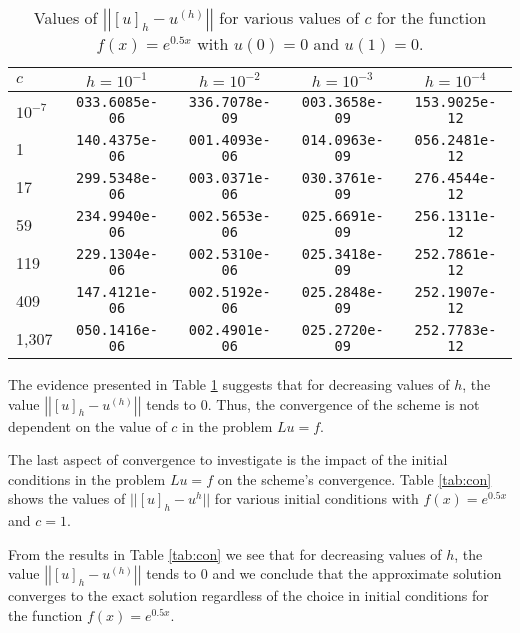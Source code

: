 \begin{table}[h!]
  \centering
  \bgroup
  \def\arraystretch{1.5}
  \begin{tabular}{| l | c | c | c | c |}
    \hline
    $c$ & $h = 10^{-1}$ & $h = 10^{-2}$ & $h = 10^{-3}$ & $h = 10^{-4}$ \\
    \hline
    $10^{-7}$ & \texttt{033.6085e-06} &  \texttt{336.7078e-09} &   \texttt{003.3658e-09} &   \texttt{153.9025e-12} \\
    1 & \texttt{140.4375e-06} &  \texttt{001.4093e-06} &   \texttt{014.0963e-09} &   \texttt{056.2481e-12} \\
    17 & \texttt{299.5348e-06} &  \texttt{003.0371e-06} &   \texttt{030.3761e-09} &   \texttt{276.4544e-12} \\
    59 & \texttt{234.9940e-06} &  \texttt{002.5653e-06} &   \texttt{025.6691e-09} &   \texttt{256.1311e-12} \\
    119 & \texttt{229.1304e-06} &  \texttt{002.5310e-06} &   \texttt{025.3418e-09} &   \texttt{252.7861e-12} \\
    409 &\texttt{147.4121e-06} &  \texttt{002.5192e-06} &   \texttt{025.2848e-09} &   \texttt{252.1907e-12} \\
    1,307 & \texttt{050.1416e-06} &  \texttt{002.4901e-06} &   \texttt{025.2720e-09} &   \texttt{252.7783e-12} \\
    \hline
  \end{tabular}
  \egroup
  \caption{Values of $\left|\left|[u]_h - u^{(h)}\right|\right|$ for various values of
    $c$ for the function $f(x) = e^{0.5x}$ with $u(0) = 0$ and $u(1) = 0$.}\label{con_c}
\end{table}

The evidence presented in Table \ref{con_c} suggests that for decreasing values of $h$,
the value $\left|\left|[u]_h - u^{(h)}\right|\right|$ tends to 0. Thus, the convergence of the
scheme is not dependent on the value of $c$ in the problem $Lu = f$.

The last aspect of convergence to investigate is the impact of the initial conditions
in the problem $Lu = f$ on the scheme's convergence.
Table \ref{tab:con} shows the values of $||[u]_h - u^{h}||$ for various
initial conditions with $f(x) = e^{0.5x}$ and $c=1$.

From the results in Table \ref{tab:con} we see that for decreasing values
of $h$, the value $\left|\left|[u]_h - u^{(h)}\right|\right|$ tends to 0 and we
conclude that the approximate solution
converges to the exact solution regardless of the choice in initial conditions for the function
$f(x) = e^{0.5x}$.

